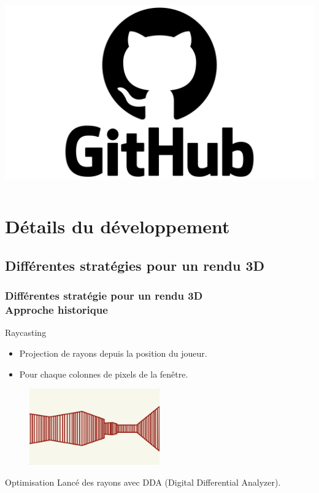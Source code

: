 \documentclass{beamer}
\begin{document}
\begin{frame}
\begin{columns}
        \centering
        \includegraphics[width=\textwidth]{images/github.png}
    \end{columns}
\end{frame}

\section{Détails du développement}
\subsection{Différentes stratégies pour un rendu 3D}

\begin{frame}
    \frametitle{Différentes stratégie pour un rendu 3D \\
                \small Approche historique}
    \begin{block}{Raycasting}
        \begin{itemize}
            \item Projection de rayons depuis la position du joueur.
            \item Pour chaque colonnes de pixels de la fenêtre.
        \end{itemize}
    \end{block}
    \begin{figure}
        \centering
        \includegraphics[width=0.5\textwidth]{images/rendu-historique.jpg}
    \end{figure}
    \vspace*{-5mm}
    \begin{block}{Optimisation}
        Lancé des rayons avec DDA (Digital Differential Analyzer).
    \end{block}
\end{frame}
\end{document}
